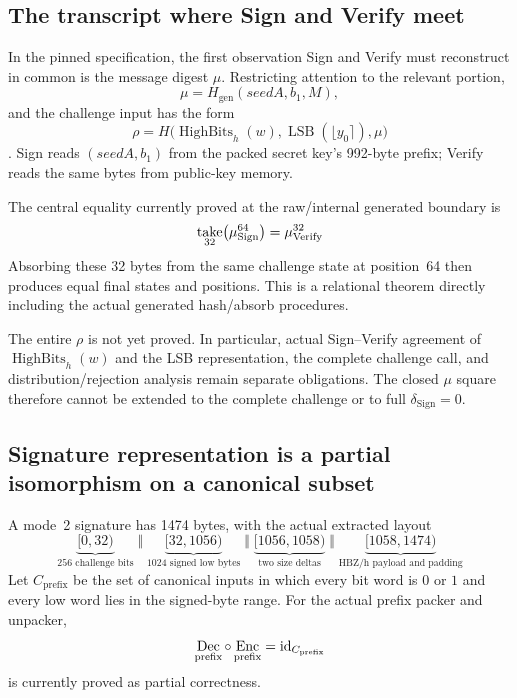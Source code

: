 \subsection{The transcript where Sign and Verify meet}

In the pinned specification, the first observation Sign and Verify must
reconstruct in common is the message digest \(\mu\).
Restricting attention to the relevant portion,
\[
  \mu=H_{\mathrm{gen}}(\mathit{seedA},b_1,M),
\]
and the challenge input has the form
\[
  \rho=H\bigl(
      \operatorname{HighBits}_h(w),
      \operatorname{LSB}(\lfloor y_0\rceil),
      \mu\bigr)
\]
\cite{haetae-spec}. Sign reads \((\mathit{seedA},b_1)\) from the packed
secret key's 992-byte prefix; Verify reads the same bytes from public-key
memory.

The central equality currently proved at the raw/internal generated boundary is
\[
  \mathop{\mathrm{take}}_{32}\bigl(\mu_{\mathrm{Sign}}^{64}\bigr)
  =\mu_{\mathrm{Verify}}^{32}
\]
Absorbing these 32 bytes from the same challenge state at position~64 then
produces equal final states and positions. This is a relational theorem
directly including the actual generated hash/absorb procedures.

The entire \(\rho\) is not yet proved. In particular, actual Sign--Verify
agreement of \(\operatorname{HighBits}_h(w)\) and the LSB representation,
the complete challenge call, and distribution/rejection analysis remain
separate obligations. The closed \(\mu\) square therefore cannot be extended
to the complete challenge or to full \(\delta_{\mathrm{Sign}}=0\).

\subsection{Signature representation is a partial isomorphism on a canonical subset}

A mode~2 signature has 1474 bytes, with the actual extracted layout
\[
\underbrace{[0,32)}_{256\text{ challenge bits}}
\;\Vert\;
\underbrace{[32,1056)}_{1024\text{ signed low bytes}}
\;\Vert\;
\underbrace{[1056,1058)}_{\text{two size deltas}}
\;\Vert\;
\underbrace{[1058,1474)}_{\text{HBZ/h payload and padding}}
\]
Let \(C_{\mathrm{prefix}}\) be the set of canonical inputs in which every bit
word is \(0\) or \(1\) and every low word lies in the signed-byte range.
For the actual prefix packer and unpacker,
\[
  \mathop{\mathrm{Dec}}_{\mathrm{prefix}}\circ
  \mathop{\mathrm{Enc}}_{\mathrm{prefix}}
  =\operatorname{id}_{C_{\mathrm{prefix}}}
\]
is currently proved as partial correctness.

